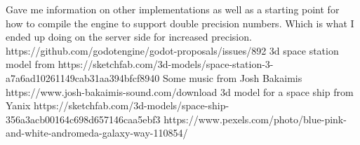 \documentclass[12pt, DIV=calc]{scrartcl}
\begin{document}
Gave me information on other implementations as well as a starting point for how to compile the engine to support double precision numbers. Which is what I ended up doing on the server side for increased precision. https://github.com/godotengine/godot-proposals/issues/892
3d space station model from https://sketchfab.com/3d-models/space-station-3-a7a6ad10261149cab31aa394bfcf8940
Some music from Josh Bakaimis https://www.josh-bakaimis-sound.com/download
3d model for a space ship from Yanix https://sketchfab.com/3d-models/space-ship-356a3acb00164c698d657146caa5ebf3
https://www.pexels.com/photo/blue-pink-and-white-andromeda-galaxy-way-110854/
\end{document}
